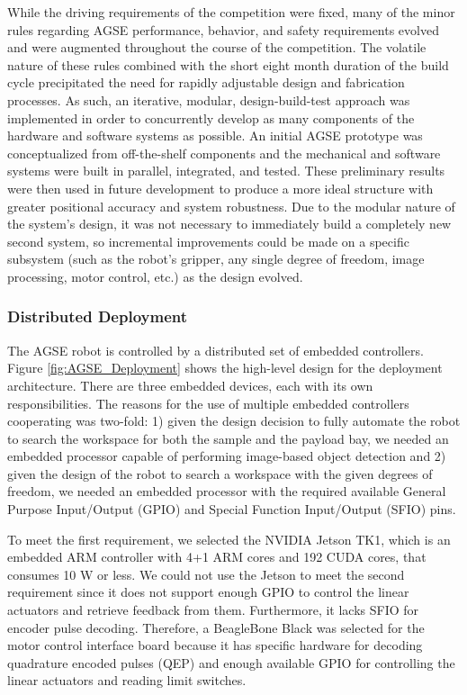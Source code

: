 While the driving requirements of the competition were fixed, many of
the minor rules regarding AGSE performance, behavior, and safety
requirements evolved and were augmented throughout the course of the
competition. The volatile nature of these rules combined with the
short eight month duration of the build cycle precipitated the need
for rapidly adjustable design and fabrication processes. As such, an
iterative, modular, design-build-test approach was implemented in
order to concurrently develop as many components of the hardware and
software systems as possible. An initial AGSE prototype was
conceptualized from off-the-shelf components and the mechanical and
software systems were built in parallel, integrated, and tested. These
preliminary results were then used in future development to produce a
more ideal structure with greater positional accuracy and system
robustness.  Due to the modular nature of the system's design, it was
not necessary to immediately build a completely new second system, so
incremental improvements could be made on a specific subsystem (such
as the robot's gripper, any single degree of freedom, image
processing, motor control, etc.) as the design evolved.

\subsubsection{Distributed Deployment}

The AGSE robot is controlled by a distributed set of embedded
controllers. Figure \ref{fig:AGSE_Deployment} shows the high-level
design for the deployment architecture. There are three embedded
devices, each with its own responsibilities.  The reasons for the use
of multiple embedded controllers cooperating was two-fold: 1) given
the design decision to fully automate the robot to search the
workspace for both the sample and the payload bay, we needed an
embedded processor capable of performing image-based object detection
and 2) given the design of the robot to search a workspace with the
given degrees of freedom, we needed an embedded processor with the
required available General Purpose Input/Output (GPIO) and Special
Function Input/Output (SFIO) pins. 

To meet the first requirement, we selected the NVIDIA Jetson TK1, which is an embedded ARM controller
with 4+1 ARM cores and 192 CUDA cores, that consumes 10 W or less.
We could not use the Jetson to meet the second requirement since it
does not support enough GPIO to control the linear actuators and
retrieve feedback from them.  Furthermore, it lacks SFIO for encoder
pulse decoding.  Therefore, a BeagleBone Black was selected for the
motor control interface board because it has specific hardware for
decoding quadrature encoded pulses (QEP) and enough available GPIO for
controlling the linear actuators and reading limit switches.

